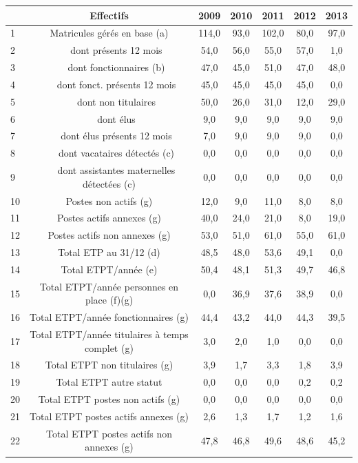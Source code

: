 \begin{longtable}[]{@{}lcccccc@{}}
\toprule
& Effectifs & 2009 & 2010 & 2011 & 2012 & 2013\tabularnewline
\midrule
\endhead
1 & Matricules gérés en base (a) & 114,0 & 93,0 & 102,0 & 80,0 &
97,0\tabularnewline
2 & ~~~dont présents 12 mois & 54,0 & 56,0 & 55,0 & 57,0 &
1,0\tabularnewline
3 & ~~~dont fonctionnaires (b) & 47,0 & 45,0 & 51,0 & 47,0 &
48,0\tabularnewline
4 & ~~~dont fonct. présents 12 mois & 45,0 & 45,0 & 45,0 & 45,0 &
0,0\tabularnewline
5 & ~~~dont non titulaires & 50,0 & 26,0 & 31,0 & 12,0 &
29,0\tabularnewline
6 & ~~~dont élus & 9,0 & 9,0 & 9,0 & 9,0 & 9,0\tabularnewline
7 & ~~~dont élus présents 12 mois & 7,0 & 9,0 & 9,0 & 9,0 &
0,0\tabularnewline
8 & ~~~dont vacataires détectés (c) & 0,0 & 0,0 & 0,0 & 0,0 &
0,0\tabularnewline
9 & ~~~dont assistantes maternelles détectées (c) & 0,0 & 0,0 & 0,0 &
0,0 & 0,0\tabularnewline
10 & Postes non actifs (g) & 12,0 & 9,0 & 11,0 & 8,0 &
8,0\tabularnewline
11 & Postes actifs annexes (g) & 40,0 & 24,0 & 21,0 & 8,0 &
19,0\tabularnewline
12 & Postes actifs non annexes (g) & 53,0 & 51,0 & 61,0 & 55,0 &
61,0\tabularnewline
13 & Total ETP au 31/12 (d) & 48,5 & 48,0 & 53,6 & 49,1 &
0,0\tabularnewline
14 & Total ETPT/année (e) & 50,4 & 48,1 & 51,3 & 49,7 &
46,8\tabularnewline
15 & Total ETPT/année personnes en place (f)(g) & 0,0 & 36,9 & 37,6 &
38,9 & 0,0\tabularnewline
16 & Total ETPT/année fonctionnaires (g) & 44,4 & 43,2 & 44,0 & 44,3 &
39,5\tabularnewline
17 & Total ETPT/année titulaires à temps complet (g) & 3,0 & 2,0 & 1,0 &
0,0 & 0,0\tabularnewline
18 & Total ETPT non titulaires (g) & 3,9 & 1,7 & 3,3 & 1,8 &
3,9\tabularnewline
19 & Total ETPT autre statut & 0,0 & 0,0 & 0,0 & 0,2 &
0,2\tabularnewline
20 & Total ETPT postes non actifs (g) & 0,0 & 0,0 & 0,0 & 0,0 &
0,0\tabularnewline
21 & Total ETPT postes actifs annexes (g) & 2,6 & 1,3 & 1,7 & 1,2 &
1,6\tabularnewline
22 & Total ETPT postes actifs non annexes (g) & 47,8 & 46,8 & 49,6 &
48,6 & 45,2\tabularnewline
\bottomrule
\end{longtable}


